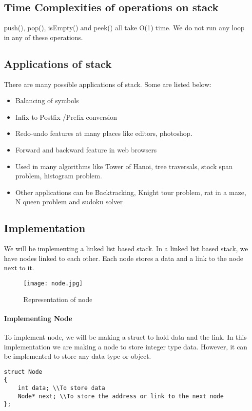 \documentclass[11pt,fleqn]{book} %
\begin{document}
\subsection{Time Complexities of operations on stack}
push(), pop(), isEmpty() and peek() all take O(1) time. We do not run any loop in any of these operations.

\subsection{Applications of stack}
There are many possible applications of stack. Some are listed below:
\begin{itemize}
	\item Balancing of symbols
	\item Infix to Postfix /Prefix conversion
	\item Redo-undo features at many places like editors, photoshop.
	\item Forward and backward feature in web browsers
	\item Used in many algorithms like Tower of Hanoi, tree traversals, stock span problem, histogram problem.
	\item Other applications can be Backtracking, Knight tour problem, rat in a maze, N queen problem and sudoku solver
\end{itemize}
\subsection{Implementation}
We will be implementing a linked list based stack. In a linked list based stack, we have nodes linked to each other.
Each node stores a data and a link to the node next to it.
\begin{figure}[H]
	\centering
	\texttt{[image: node.jpg]}
	\caption{Representation of node}
\end{figure}
\paragraph{Implementing Node}
To implement node, we will be making a struct to hold data and the link. In this implementation we are making a node to store integer type data. However, it can be implemented to store any data type or object.
\begin{lstlisting}
struct Node
{
	int data; \\To store data
	Node* next; \\To store the address or link to the next node
};
\end{lstlisting}
\newpage
\end{document}
